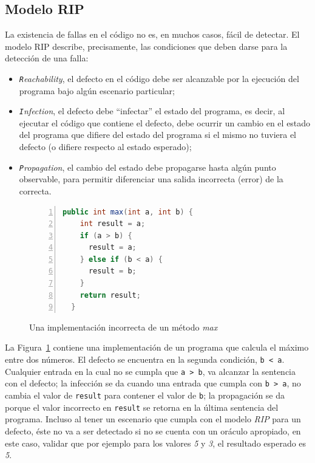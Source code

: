 \pagebreak
\subsection{Modelo RIP}

La existencia de fallas en el c\'odigo no es, en muchos casos, f\'acil de detectar. El modelo RIP describe, precisamente, las condiciones que deben darse para la detecci\'on de una falla: 
\begin{itemize}
\item \emph{\texttt{R}eachability}, el defecto en el c\'odigo debe ser alcanzable por la ejecuci\'on del programa bajo alg\'un escenario particular;
\item \emph{\texttt{I}nfection}, el defecto debe ``infectar'' el estado del programa, es decir, al ejecutar el c\'odigo que contiene el defecto, debe ocurrir un cambio en el estado del programa que difiere del estado del programa si el mismo no tuviera el defecto (o difiere respecto al estado esperado); 
\item \emph{\texttt{P}ropagation}, el cambio del estado debe propagarse hasta alg\'un punto observable, para permitir diferenciar una salida incorrecta (error) de la correcta.
\end{itemize}

\begin{figure}
	\begin{lstlisting}[frame=single,numbers=left, mathescape=true,framexleftmargin=1.5em,language=Java,basicstyle={},xleftmargin=.055\textwidth,xrightmargin=.01\textwidth]
  public int max(int a, int b) {
    int result = a;
    if (a > b) {
      result = a;
    } else if (b < a) {
      result = b;
    }
    return result;
  }
	\end{lstlisting}
	\caption{Una implementaci\'on incorrecta de un m\'etodo \emph{max}}
	\label{figures.examples.testing.rip}
\end{figure}

La Figura~\ref{figures.examples.testing.rip} contiene una implementaci\'on de un programa que calcula el m\'aximo entre dos n\'umeros. El defecto se encuentra en la segunda condici\'on, \texttt{b < a}. Cualquier entrada en la cual no se cumpla que \texttt{a > b}, va alcanzar la sentencia con el defecto; la infecci\'on se da cuando una entrada que cumpla con \texttt{b > a}, no cambia el valor de \texttt{result} para contener el valor de \texttt{b}; la propagaci\'on se da porque el valor incorrecto en \texttt{result} se retorna en la \'ultima sentencia del programa. Incluso al tener un escenario que cumpla con el modelo \emph{RIP} para un defecto, \'este no va a ser detectado si no se cuenta con un or\'aculo apropiado, en este caso, validar que por ejemplo para los valores \emph{5} y \emph{3}, el resultado esperado es \emph{5}.

